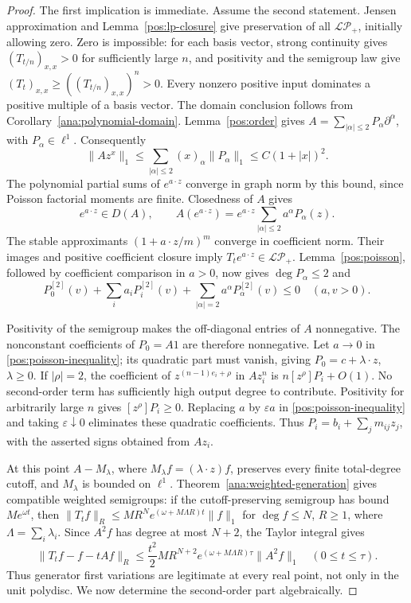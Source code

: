 \documentclass[reqno]{amsart}
\theoremstyle{definition}
\theoremstyle{remark}
\begin{document}
\begin{proof}
The first implication is immediate.  Assume the second statement.  Jensen
approximation and Lemma~\ref{pos:lp-closure} give preservation of all
\(\mathcal{LP}_+\), initially allowing zero.  Zero is impossible: for each basis
vector, strong continuity gives \((T_{t/n})_{x,x}>0\) for sufficiently large
\(n\), and positivity and the semigroup law give
\((T_t)_{x,x}\ge((T_{t/n})_{x,x})^n>0\).
Every nonzero positive input dominates a positive multiple of a basis vector.
The domain conclusion follows from Corollary~\ref{ana:polynomial-domain}.  Lemma~\ref{pos:order} gives
\(A=\sum_{|\alpha|\le2}P_\alpha\partial^\alpha\), with \(P_\alpha\in\ell^1\).
Consequently
\begin{equation}\label{pos:graph-bound}
 \|Az^x\|_1\le\sum_{|\alpha|\le2}(x)_\alpha\|P_\alpha\|_1
 \le C(1+|x|)^2.
\end{equation}
The polynomial partial sums of \(e^{a\cdot z}\) converge in graph norm by this
bound, since Poisson factorial moments are finite.  Closedness of \(A\) gives
\[
 e^{a\cdot z}\in D(A),\qquad
 A(e^{a\cdot z})=e^{a\cdot z}\sum_{|\alpha|\le2}a^\alpha P_\alpha(z).
\]
The stable approximants \((1+a\cdot z/m)^m\) converge in coefficient norm.
Their images and positive coefficient closure imply
\(T_te^{a\cdot z}\in\mathcal{LP}_+\).
Lemma~\ref{pos:poisson}, followed by coefficient comparison in \(a>0\), now gives
\(\deg P_\alpha\le2\) and
\begin{equation}\label{pos:poisson-inequality}
 P_0^{[2]}(v)+\sum_i a_iP_i^{[2]}(v)
 +\sum_{|\alpha|=2}a^\alpha P_\alpha^{[2]}(v)\le0
 \quad(a,v>0).
\end{equation}

Positivity of the semigroup makes the off-diagonal entries of \(A\) nonnegative.
The nonconstant coefficients of \(P_0=A1\) are therefore nonnegative.  Let
\(a\to0\) in \eqref{pos:poisson-inequality}; its quadratic part must vanish, giving
\(P_0=c+\lambda\cdot z\), \(\lambda\ge0\).
If \(|\rho|=2\), the coefficient of \(z^{(n-1)e_i+\rho}\) in \(Az_i^n\) is
\(n[z^\rho]P_i+O(1)\).  No second-order term has sufficiently high output degree
to contribute.  Positivity for arbitrarily large \(n\) gives
\([z^\rho]P_i\ge0\).  Replacing \(a\) by \(\varepsilon a\) in
\eqref{pos:poisson-inequality} and taking \(\varepsilon\downarrow0\) eliminates
these quadratic coefficients.  Thus
\(P_i=b_i+\sum_jm_{ij}z_j\), with the asserted signs obtained from \(Az_i\).

At this point \(A-M_\lambda\), where \(M_\lambda f=(\lambda\cdot z)f\), preserves
every finite total-degree cutoff, and \(M_\lambda\) is bounded on \(\ell^1\).
Theorem~\ref{ana:weighted-generation} gives compatible weighted semigroups:
if the cutoff-preserving semigroup has bound \(Me^{\omega t}\), then
\(\|T_tf\|_R\le M R^N e^{(\omega+M\Lambda R)t}\|f\|_1\) for
\(\deg f\le N\), \(R\ge1\), where \(\Lambda=\sum_i\lambda_i\).
Since \(A^2f\) has degree at most \(N+2\), the Taylor integral gives
\[
 \|T_tf-f-tAf\|_R\le
 \frac{t^2}{2}M R^{N+2}e^{(\omega+M\Lambda R)\tau}\|A^2f\|_1
 \quad(0\le t\le\tau).
\]
Thus generator first variations are legitimate at every real point, not only
in the unit polydisc.  We now determine the second-order part algebraically.


\end{proof}
\end{document}
